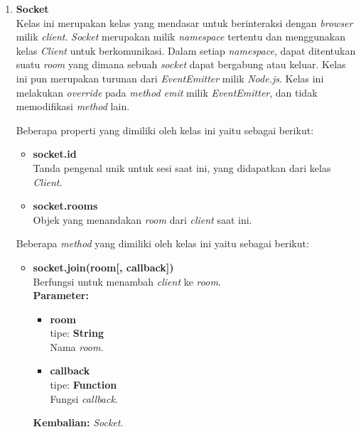 \begin{enumerate}
\begin{itemize}
%	

	\end{itemize}
	
	\item \textbf{Socket} \\
	Kelas ini merupakan kelas yang mendasar untuk berinteraksi dengan \textit{browser} milik \textit{client}. \textit{Socket} merupakan milik \textit{namespace} tertentu dan menggunakan kelas \textit{Client} untuk berkomunikasi. Dalam setiap \textit{namespace}, dapat ditentukan suatu \textit{room} yang dimana sebuah \textit{socket} dapat bergabung atau keluar. Kelas ini pun merupakan turunan dari \textit{EventEmitter} milik \textit{Node.js}. Kelas ini melakukan \textit{override} pada \textit{method emit} milik \textit{EventEmitter}, dan tidak memodifikasi \textit{method} lain.
	
	Beberapa properti yang dimiliki oleh kelas ini yaitu sebagai berikut:
	\begin{itemize}
		\item \textbf{socket.id} \\ Tanda pengenal unik untuk sesi saat ini, yang didapatkan dari kelas \textit{Client}.
		\item \textbf{socket.rooms} \\ Objek yang menandakan \textit{room} dari \textit{client} saat ini.
	\end{itemize}

	Beberapa \textit{method} yang dimiliki oleh kelas ini yaitu sebagai berikut:
	\begin{itemize}
		\item \textbf{socket.join(room[, callback])} \\
		Berfungsi untuk menambah \textit{client} ke \textit{room}. \\
		\textbf{Parameter:}
		\begin{itemize}
			\item \textbf{room} \\tipe: \textbf{String} \\ Nama \textit{room}.
			\item \textbf{callback} \\tipe: \textbf{Function} \\ Fungsi \textit{callback}.
		\end{itemize}
		\textbf{Kembalian:} \textit{Socket}.
		

\end{itemize}
\end{enumerate}
